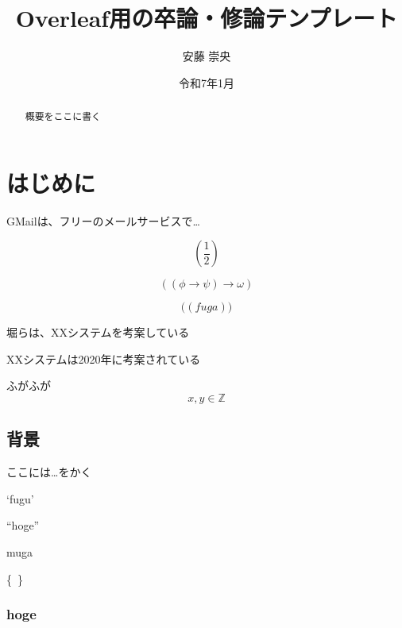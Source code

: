\documentclass[uplatex,a4paper,12pt]{ujreport}
\title{Overleaf用の卒論・修論テンプレート}
\author{安藤 崇央}
\date{令和7年1月}
\begin{document}
\thispagestyle{empty}
\maketitle

\begin{abstract}
概要をここに書く
\end{abstract}

\tableofcontents

\setcounter{page}{0}



\chapter{はじめに}
GMail\cite{gmail}は、フリーのメールサービスで…

\[
\left( \frac{1}{2} \right)
\]

\[
    \left( (\phi \to \psi) \to \omega \right)
\]


\[
    \biggl( (\mathit{fuga}) \biggr)
\]

堀らは、XXシステム\cite{hori-icaiic2020}を考案している

XXシステム\cite{hori-icaiic2020}は2020年に考案されている

ふがふが
\[
    x, y \in \mathbb{Z}
\]

\section{背景}
ここには…をかく\cite{hori-icaiic2020}

`fugu'

``hoge''

muga

\{~\}

\subsection{hoge}
\end{document}
